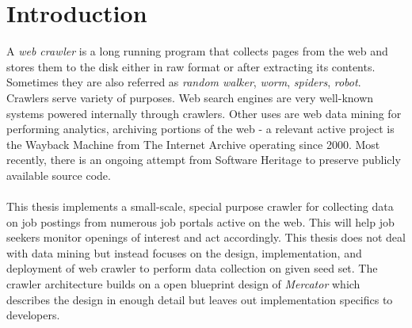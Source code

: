 \chapter{Introduction}
A \textit{web crawler} is a long running program that collects pages from the web and stores them to the
disk either in raw format or after extracting its contents. Sometimes they are also referred as
\textit{random walker}, \textit{worm}, \textit{spiders}, \textit{robot}. Crawlers serve variety of
purposes. Web search engines are very well-known systems powered internally through crawlers.
Other uses are web data mining for performing analytics, archiving portions of the web - a
relevant active project is the Wayback Machine from The Internet Archive\cite{netarchive} operating since 2000. Most recently,
there is an ongoing attempt from Software Heritage\cite{swheritage} to preserve publicly available
source code.
\\
\\
This thesis implements a small-scale, special purpose crawler for collecting data on job postings from
numerous job portals active on the web. This will help job seekers monitor openings of interest and
act accordingly. This thesis does not deal with data mining but instead focuses on the design, implementation, and deployment of web crawler to perform data collection on given seed set. The crawler architecture builds on a open blueprint design of \textit{Mercator}\cite{mercator} which describes the design in enough detail but leaves out implementation specifics to developers.
\\
\\
